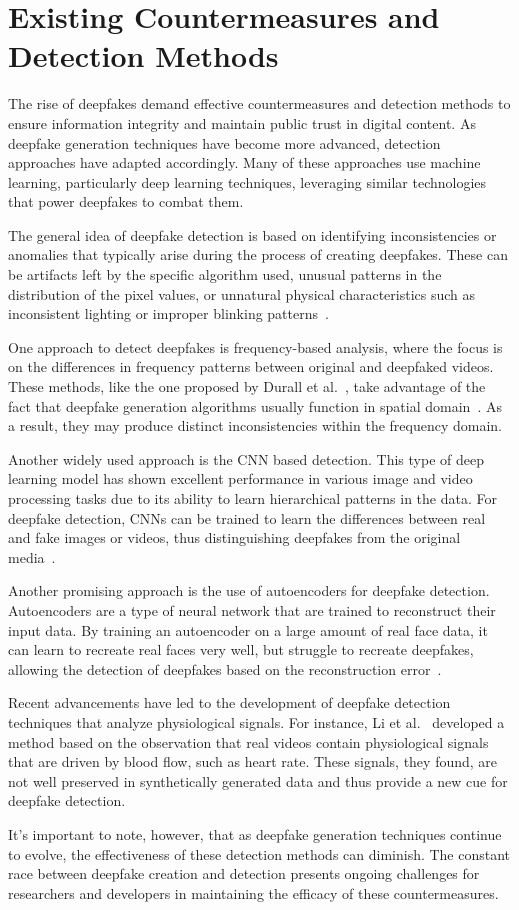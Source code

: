 \section{Existing Countermeasures and Detection Methods}\label{chapter:countermeasures}
The rise of deepfakes demand effective countermeasures and detection methods
to ensure information integrity and maintain public trust
in digital content. As deepfake generation techniques have become more advanced,
detection approaches have adapted accordingly. Many of these
approaches use machine learning, particularly deep learning techniques,
leveraging similar technologies that power deepfakes to combat them.

The general idea of deepfake detection is based on identifying inconsistencies
or anomalies that typically arise during the process of creating deepfakes. These
can be artifacts left by the specific algorithm used, unusual patterns in the
distribution of the pixel values, or unnatural physical characteristics
such as inconsistent lighting or improper blinking patterns~\cite{Agarwal_2019_CVPR_Workshops}.

One approach to detect deepfakes is frequency-based analysis, where the focus is
on the differences in frequency patterns between original and deepfaked videos.
These methods, like the one proposed by Durall et al.~\cite{durall2020unmasking},
take advantage of the fact that deepfake generation algorithms usually function in
spatial domain~\cite{spatial-domain}. As a result, they may produce distinct inconsistencies
within the frequency domain.

Another widely used approach is the \ac{CNN} based detection. This type of deep
learning model has shown excellent performance in various image and video
processing tasks due to its ability to learn hierarchical patterns in the data.
For deepfake detection, \ac{CNN}s can be trained to learn the differences between
real and fake images or videos, thus distinguishing deepfakes from the original
media~\cite{nguyen2018capsuleforensics}.

Another promising approach is the use of autoencoders for deepfake detection.
Autoencoders are a type of neural network that are trained to reconstruct
their input data. By training an autoencoder on a large amount of real face
data, it can learn to recreate real faces very well, but struggle to recreate
deepfakes, allowing the detection of deepfakes based on the reconstruction
error~\cite{cozzolino2017recasting}.

Recent advancements have led to the development of deepfake detection techniques
that analyze physiological signals. For instance, Li et al.~\cite{li2018ictu}
developed a method based on the observation that real videos contain physiological
signals that are driven by blood flow, such as heart rate. These signals, they
found, are not well preserved in synthetically generated data and thus provide
a new cue for deepfake detection.

It's important to note, however, that as deepfake generation techniques
continue to evolve, the effectiveness of these detection methods can diminish.
The constant race between deepfake creation and detection presents ongoing
challenges for researchers and developers in maintaining the efficacy of these
countermeasures.